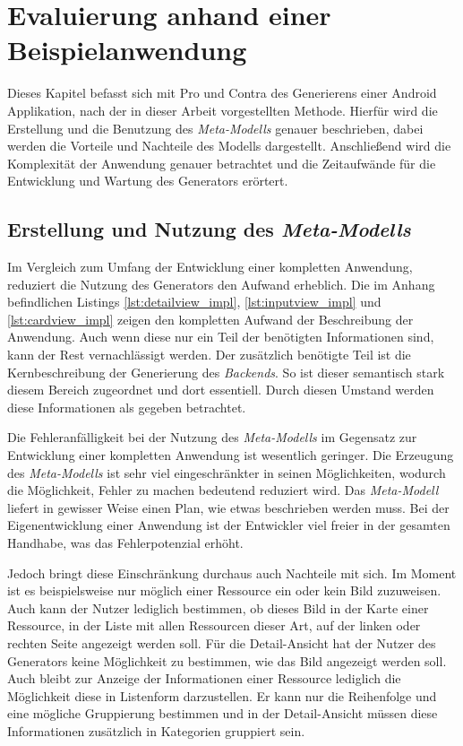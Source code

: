 \chapter{Evaluierung anhand einer Beispielanwendung}
Dieses Kapitel befasst sich mit Pro und Contra des Generierens einer Android Applikation, nach der in dieser Arbeit vorgestellten Methode.
Hierfür wird die Erstellung und die Benutzung des \textit{Meta-Modells} genauer beschrieben, dabei werden die Vorteile und Nachteile des Modells dargestellt. Anschließend wird die Komplexität der Anwendung genauer betrachtet und die Zeitaufwände für die Entwicklung und Wartung des Generators erörtert.

\section{Erstellung und Nutzung des \textit{Meta-Modells}}

Im Vergleich zum Umfang der Entwicklung einer kompletten Anwendung, reduziert die Nutzung des Generators den Aufwand erheblich. Die im Anhang befindlichen Listings \ref{lst:detailview_impl}, \ref{lst:inputview_impl} und \ref{lst:cardview_impl} zeigen den kompletten Aufwand der Beschreibung der Anwendung. Auch wenn diese nur ein Teil der benötigten Informationen sind, kann der Rest vernachlässigt werden. Der zusätzlich benötigte Teil ist die Kernbeschreibung der Generierung des \textit{Backends}. So ist dieser semantisch stark diesem Bereich zugeordnet und dort essentiell. Durch diesen Umstand werden diese Informationen als gegeben betrachtet.

Die Fehleranfälligkeit bei der Nutzung des \textit{Meta-Modells} im Gegensatz zur Entwicklung einer kompletten Anwendung ist wesentlich geringer. Die Erzeugung des \textit{Meta-Modells} ist sehr viel eingeschränkter in seinen Möglichkeiten, wodurch die Möglichkeit, Fehler zu machen bedeutend reduziert wird. Das \textit{Meta-Modell} liefert in gewisser Weise einen Plan, wie etwas beschrieben werden muss. Bei der Eigenentwicklung einer Anwendung ist der Entwickler viel freier in der gesamten Handhabe, was das Fehlerpotenzial erhöht.

Jedoch bringt diese Einschränkung durchaus auch Nachteile mit sich. Im Moment ist es beispielsweise nur möglich einer Ressource ein oder kein Bild zuzuweisen. Auch kann der Nutzer lediglich bestimmen, ob dieses Bild in der Karte einer Ressource, in der Liste mit allen Ressourcen dieser Art, auf der linken oder rechten Seite angezeigt werden soll. Für die Detail-Ansicht hat der Nutzer des Generators keine Möglichkeit zu bestimmen, wie das Bild angezeigt werden soll.
Auch bleibt zur Anzeige der Informationen einer Ressource lediglich die Möglichkeit diese in Listenform darzustellen. Er kann nur die Reihenfolge und eine mögliche Gruppierung bestimmen und in der Detail-Ansicht müssen diese Informationen zusätzlich in Kategorien gruppiert sein. 

